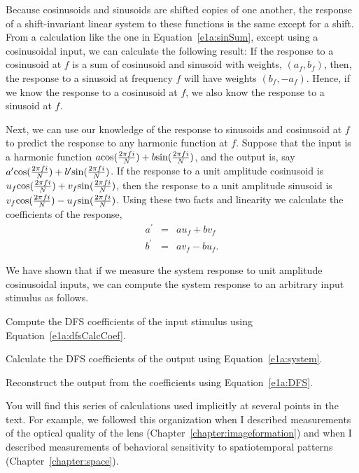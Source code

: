 Because cosinusoids and sinusoids are shifted copies of one another,
the response of a shift-invariant linear system to these functions is
the same except for a shift.  From a calculation like the one in
Equation~\ref{e1a:sinSum}, except using a cosinusoidal input, we can
calculate the following result: If the response to a cosinusoid at $f$
is a sum of cosinusoid and sinusoid with weights, $(a_f, b_f)$, then,
the response to a sinusoid at frequency $f$ will have weights $(b_f,
-a_f)$.  Hence, if we know the response to a cosinusoid at $f$, we
also know the response to a sinusoid at $f$.

Next, we can use our knowledge of the response to sinusoids and
cosinusoid at $f$ to predict the response to any harmonic function at
$f$.  Suppose that the input is a harmonic function $a \mbox{$\cos ( \frac{2 \pi f i}{ N } )$} + b
\mbox{$\sin ( \frac {2 \pi f i}{ N } )$}$, and the output is, say $a^\prime \mbox{$\cos ( \frac{2 \pi f i}{ N } )$} + b^\prime
\mbox{$\sin ( \frac {2 \pi f i}{ N } )$}$.  If the response to a unit amplitude
cosinusoid is $u_f \mbox{$\cos ( \frac{2 \pi f i}{ N } )$} + v_f \mbox{$\sin ( \frac {2 \pi f i}{ N } )$}$, then the response to a unit
amplitude sinusoid is $v_f \mbox{$\cos ( \frac{2 \pi f i}{ N } )$} - u_f \mbox{$\sin ( \frac {2 \pi f i}{ N } )$}$.  Using these two facts
and linearity we calculate the coefficients of the response,
\begin{eqnarray}
\label{e1a:system}
a^\prime & = & a  u_f + b v_f  \nonumber \\
b^\prime & = & a  v_f - b u_f .
\end{eqnarray}

We have shown that if we measure the system response to unit amplitude
cosinusoidal inputs, we can compute the system response to an
arbitrary input stimulus as follows.
\be
\item 
Compute the DFS coefficients of the input stimulus using
Equation~\ref{e1a:dfsCalcCoef}.

\item 
Calculate the DFS coefficients of the output using
Equation~\ref{e1a:system}.

\item 
Reconstruct the output from the coefficients using
Equation~\ref{e1a:DFS}.

\ee
You will find this series of calculations used implicitly at several
points in the text.  For example, we followed this organization when I
described measurements of the optical quality of the lens
(Chapter~\ref{chapter:imageformation}) and when I described
measurements of behavioral sensitivity to spatiotemporal patterns
(Chapter~\ref{chapter:space}).
